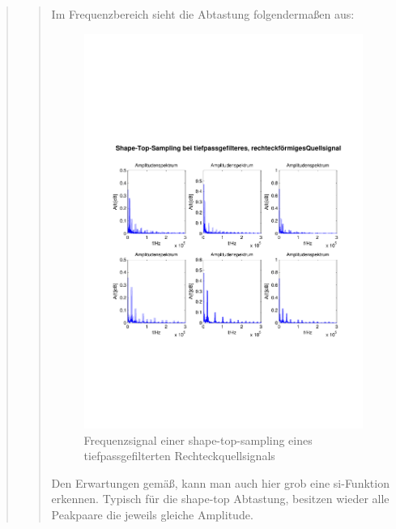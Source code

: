 \begin{quote}
\begin{quote}
        	Im Frequenzbereich sieht die Abtastung folgendermaßen aus:
        	
        	\begin{figure}[H]
            \centering
            \includegraphics[scale=0.6, trim = 1.5cm 6cm 1cm 8cm,
            clip]{./Bilder/shape-top-tp-recht_freq}
                \caption{Frequenzsignal einer shape-top-sampling eines tiefpassgefilterten Rechteckquellsignals}
      	    \end{figure}
        	
        	Den Erwartungen gemäß, kann man auch hier grob eine si-Funktion
        	erkennen. Typisch für die shape-top Abtastung, besitzen wieder alle
        	Peakpaare die jeweils gleiche Amplitude.
        
        \end{quote}  %
        

\end{quote}
